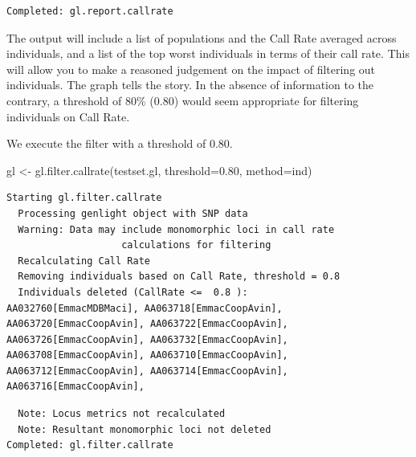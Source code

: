 \documentclass[
  letterpaper,
  DIV=11,
  numbers=noendperiod]{scrreprt}
\newenvironment{Shaded}{\begin{snugshade}}{\end{snugshade}}
\newcommand{\AttributeTok}[1]{\textcolor[rgb]{0.49,0.56,0.16}{#1}}
\newcommand{\FloatTok}[1]{\textcolor[rgb]{0.25,0.63,0.44}{#1}}
\newcommand{\FunctionTok}[1]{\textcolor[rgb]{0.02,0.16,0.49}{#1}}
\newcommand{\NormalTok}[1]{\textcolor[rgb]{0.00,0.44,0.13}{#1}}
\newcommand{\OtherTok}[1]{\textcolor[rgb]{0.00,0.44,0.13}{#1}}
\newcommand{\StringTok}[1]{\textcolor[rgb]{0.25,0.44,0.63}{#1}}
\let\textttOrig\texttt
\renewcommand{\texttt}[1]{\textttOrig{\color{blue}{#1}}}
\begin{document}
\begin{verbatim}
Completed: gl.report.callrate 
\end{verbatim}

The output will include a list of populations and the Call Rate averaged
across individuals, and a list of the top worst individuals in terms of
their call rate. This will allow you to make a reasoned judgement on the
impact of filtering out individuals. The graph tells the story. In the
absence of information to the contrary, a threshold of 80\% (0.80) would
seem appropriate for filtering individuals on Call Rate.

We execute the filter with a threshold of 0.80.

\begin{Shaded}
\begin{Highlighting}[]
\NormalTok{gl }\OtherTok{\textless{}{-}} \FunctionTok{gl.filter.callrate}\NormalTok{(testset.gl, }\AttributeTok{threshold=}\FloatTok{0.80}\NormalTok{, }\AttributeTok{method=}\StringTok{\textquotesingle{}ind\textquotesingle{}}\NormalTok{)}
\end{Highlighting}
\end{Shaded}

\begin{verbatim}
Starting gl.filter.callrate 
  Processing genlight object with SNP data
  Warning: Data may include monomorphic loci in call rate 
                    calculations for filtering
  Recalculating Call Rate
  Removing individuals based on Call Rate, threshold = 0.8 
  Individuals deleted (CallRate <=  0.8 ):
AA032760[EmmacMDBMaci], AA063718[EmmacCoopAvin], AA063720[EmmacCoopAvin], AA063722[EmmacCoopAvin], AA063726[EmmacCoopAvin], AA063732[EmmacCoopAvin], AA063708[EmmacCoopAvin], AA063710[EmmacCoopAvin], AA063712[EmmacCoopAvin], AA063714[EmmacCoopAvin], AA063716[EmmacCoopAvin],
\end{verbatim}

\begin{figure}[H]

{\centering \texttt{[image: basicfiltering\_files/figure-pdf/unnamed-chunk-9-1.pdf]}

}

\end{figure}

\begin{verbatim}
  Note: Locus metrics not recalculated
  Note: Resultant monomorphic loci not deleted
Completed: gl.filter.callrate 
\end{verbatim}
\end{document}

